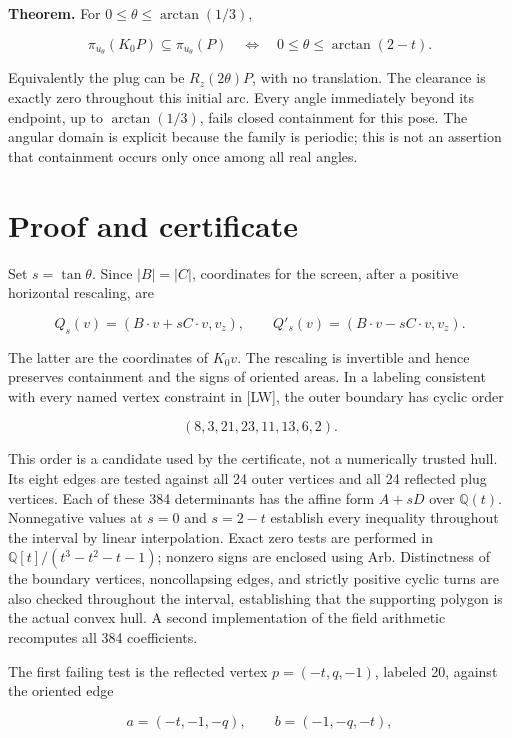 \documentclass[
  10pt,
  a4paper,
]{article}
\begin{document}
\textbf{Theorem.} For \(0\leq\theta\leq\arctan(1/3)\),

\[\pi_{u_\theta}(K_0P)\subseteq\pi_{u_\theta}(P)
\quad\Longleftrightarrow\quad
0\leq\theta\leq\boxed{\arctan(2-t)}.\]

Equivalently the plug can be \(R_z(2\theta)P\), with no translation. The
clearance is exactly zero throughout this initial arc. Every angle
immediately beyond its endpoint, up to \(\arctan(1/3)\), fails closed
containment for this pose. The angular domain is explicit because the
family is periodic; this is not an assertion that containment occurs
only once among all real angles.

\newpage

\section{Proof and certificate}\label{proof-and-certificate}

Set \(s=\tan\theta\). Since \(|B|=|C|\), coordinates for the screen,
after a positive horizontal rescaling, are

\[Q_s(v)=(B\cdot v+sC\cdot v,v_z),\qquad
Q'_s(v)=(B\cdot v-sC\cdot v,v_z).\]

The latter are the coordinates of \(K_0v\). The rescaling is invertible
and hence preserves containment and the signs of oriented areas. In a
labeling consistent with every named vertex constraint in {[}LW{]}, the
outer boundary has cyclic order

\[(8,3,21,23,11,13,6,2).\]

This order is a candidate used by the certificate, not a numerically
trusted hull. Its eight edges are tested against all 24 outer vertices
and all 24 reflected plug vertices. Each of these 384 determinants has
the affine form \(A+sD\) over \(\mathbb Q(t)\). Nonnegative values at
\(s=0\) and \(s=2-t\) establish every inequality throughout the interval
by linear interpolation. Exact zero tests are performed in
\(\mathbb Q[t]/(t^3-t^2-t-1)\); nonzero signs are enclosed using Arb.
Distinctness of the boundary vertices, noncollapsing edges, and strictly
positive cyclic turns are also checked throughout the interval,
establishing that the supporting polygon is the actual convex hull. A
second implementation of the field arithmetic recomputes all 384
coefficients.

The first failing test is the reflected vertex \(p=(-t,q,-1)\), labeled
20, against the oriented edge

\[a=(-t,-1,-q),\qquad b=(-1,-q,-t),\]
\end{document}
